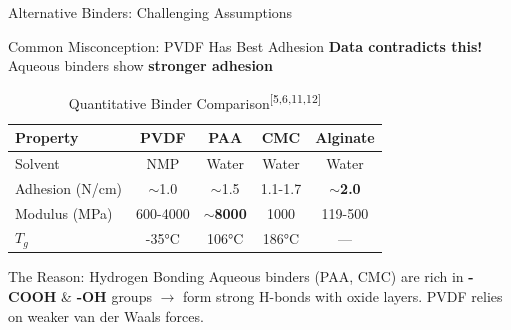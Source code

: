 \documentclass[aspectratio=169]{beamer}
\begin{document}
\begin{frame}{Alternative Binders: Challenging Assumptions}
    \begin{block}{Common Misconception: PVDF Has Best Adhesion}
        \textbf{Data contradicts this!} Aqueous binders show \textbf{stronger adhesion}
    \end{block}
    
    \begin{table}
        \caption{Quantitative Binder Comparison\textsuperscript{[5,6,11,12]}}
        \centering\footnotesize
        \begin{tabular}{lcccc}
            \toprule
            \textbf{Property} & \textbf{PVDF} & \textbf{PAA} & \textbf{CMC} & \textbf{Alginate} \\
            \midrule
            Solvent & \textcolor{AlertRed}{NMP} & Water & Water & Water \\
            Adhesion (N/cm) & $\sim$1.0 & $\sim$1.5 & 1.1-1.7 & \textbf{$\sim$2.0} \\
            Modulus (MPa) & 600-4000 & \textbf{$\sim$8000} & 1000 & 119-500 \\
            $T_g$ & -35\si{\celsius} & 106\si{\celsius} & 186\si{\celsius} & --- \\
            \bottomrule
        \end{tabular}
    \end{table}
    
    \begin{exampleblock}{The Reason: Hydrogen Bonding}
        Aqueous binders (PAA, CMC) are rich in \textbf{-COOH} \& \textbf{-OH} groups $\rightarrow$ form strong H-bonds with oxide layers. PVDF relies on weaker van der Waals forces.
    \end{exampleblock}
\end{frame}
\end{document}
